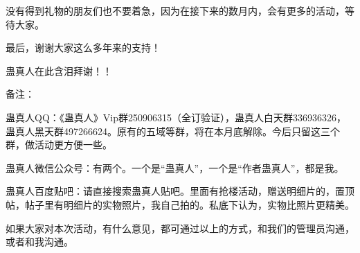 \begin{this_body}
没有得到礼物的朋友们也不要着急，因为在接下来的数月内，会有更多的活动，等待大家。

最后，谢谢大家这么多年来的支持！

蛊真人在此含泪拜谢！！

备注：

蛊真人QQ：《蛊真人》Vip群250906315（全订验证），蛊真人白天群336936326，蛊真人黑天群497266624。原有的五域等群，将在本月底解除。今后只留这三个群，做活动更方便一些。

蛊真人微信公众号：有两个。一个是“蛊真人”，一个是“作者蛊真人”，都是我。

蛊真人百度贴吧：请直接搜索蛊真人贴吧。里面有抢楼活动，赠送明细片的，置顶帖，帖子里有明细片的实物照片，我自己拍的。私底下认为，实物比照片更精美。

如果大家对本次活动，有什么意见，都可通过以上的方式，和我们的管理员沟通，或者和我沟通。

\end{this_body}


